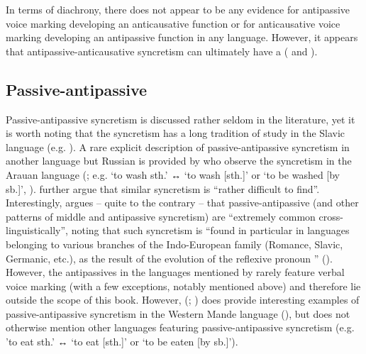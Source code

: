 In terms of diachrony, there does not appear to be any evidence for antipassive voice marking developing an anticausative function or for anticausative voice marking developing an antipassive function in any language. However, it appears that antipassive-anticausative syncretism can ultimately have a  ( and ).

\subsection{Passive-antipassive} \label{sec:simple-syncretism:pass-antp}
Passive-antipassive syncretism is discussed rather seldom in the literature, yet it is worth noting that the syncretism has a long tradition of study in the Slavic language  (e.g. \citealt{nedjalkov:silnickij:1969}). A rare explicit description of passive-antipassive syncretism in another language but Russian is provided by \citet[241]{zuniga:kittila:2019} who observe the syncretism in the Arauan language  (; e.g.  ‘to wash sth.’ ↔  ‘to wash [sth.]’ or ‘to be washed [by sb.]’, \citealt[298]{chapman:derbyshire:1991}). \citet[241]{zuniga:kittila:2019} further argue that similar syncretism is “rather difficult to find”. Interestingly, \citet[10]{creissels:2012} argues – quite to the contrary – that passive-antipassive (and other patterns of middle and antipassive syncretism) are “extremely common cross-linguistically”, noting that such syncretism is “found in particular in languages belonging to various branches of the Indo-European family (Romance, Slavic, Germanic, etc.), as the result of the evolution of the  reflexive pronoun ” (). However, the antipassives in the languages mentioned by \citeauthor{creissels:2012} rarely feature verbal voice marking (with a few exceptions, notably  mentioned above) and therefore lie outside the scope of this book. However, \citeauthor{creissels:2012} (\citeyear[10]{creissels:2012}; \citeyear[54]{creissels:2016}) does provide interesting examples of passive-antipassive syncretism in the Western Mande language  (), but does not otherwise mention other languages featuring passive-antipassive syncretism (e.g.   ’to eat sth.’ ↔  ‘to eat [sth.]’ or ‘to be eaten [by sb.]’).

